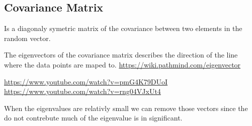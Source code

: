 \subsection{Covariance Matrix}
Is a diagonaly symetric matrix of the covariance between two elements in the random vector.

The eigenvectors of the covariance matrix describes the direction of the line where the
data points are maped to.
\url{https://wiki.pathmind.com/eigenvector}


\url{https://www.youtube.com/watch?v=pmG4K79DUoI}
\url{https://www.youtube.com/watch?v=rng04VJxUt4}

When the eigenvalues are relativly small we can remove those vectors since the do 
not contrebute much of the eigenvalue is in significant.


%
